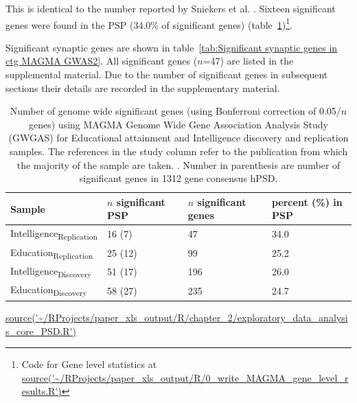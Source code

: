 This is identical to the number reported by Sniekers et al. \cite{sniekers2017genome}. Sixteen significant genes were found in the PSP (34.0\% of significant genes)  (table~\ref{tab:significant genes})\footnote{Code for Gene level statistics at \url{source('~/RProjects/paper_xls_output/R/0_write_MAGMA_gene_level_results.R')}}.  


Significant synaptic genes are shown in table~\ref{tab:Significant synaptic genes in ctg MAGMA GWAS2}. All significant genes ($n$=47) are listed in the supplemental material. Due to the number of significant genes in subsequent sections their details are recorded in the supplementary material. 

\begin{table}[ht]
    \centering
      \setlength{\extrarowheight}{2pt}
    \begin{tabular}{llll}
    \toprule
         Sample & $n$ significant PSP & $n$ significant genes & percent (\%) in PSP \\
      \midrule  
         Intelligence\textsubscript{Replication}\cite{sniekers2017genome} & 16 (7) & 47 & 34.0 \\
         Education\textsubscript{Replication}\cite{okbay2016genome} & 25 (12) & 99 & 25.2 \\
         Intelligence\textsubscript{Discovery}\cite{hill2019combined} & 51 (17) & 196 & 26.0\\
         Education\textsubscript{Discovery}\cite{hill2019combined} & 58 (27) & 235 & 24.7\\
         \bottomrule
    \end{tabular}
    
    \caption[Number of Genome wide significant genes and number of genes in PSP at GWGAS in Intelligence and Educational Attainment samples]{Number of genome wide significant genes (using Bonferroni correction of 0.05/$n$ genes)   using MAGMA Genome Wide Gene Association Analysis Study (GWGAS) for Educational attainment and Intelligence discovery and replication samples. The references in the study column refer to the publication from which the majority of the sample are taken.  . Number in parenthesis are number of significant genes in 1312 gene consensus hPSD.}
    \tiny\url{source('~/RProjects/paper_xls_output/R/chapter_2/exploratory_data_analysis_core_PSD.R')}
    \label{tab:significant genes}
\end{table}




